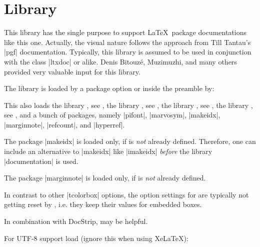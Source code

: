 \clearpage
\section{Library }\label{sec:documentation}%
%
This library has the single purpose to support \LaTeX\ package documentations
like this one. Actually, the visual nature follows the approach from
Till Tantau's |pgf| \cite{tantau:tikz_and_pgf} documentation.
Typically, this library is assumed to be used in conjunction with the
class |ltxdoc| or alike.
Denis Bitouz\'e, Muzimuzhi, and many others provided very valuable input for this library.

The library is loaded by a package option or inside the preamble by:
\begin{dispListing}
\end{dispListing}
This also loads
the library , see ,
the library , see ,
the library , see ,
the library , see ,
and a bunch of packages, namely
|pifont|, |marvosym|, |makeidx|, |marginnote|, |refcount|, and |hyperref|.

\begin{marker}
The package |makeidx| is loaded only, if  is
\emph{not} already defined. Therefore, one can include an alternative to |makeidx| like
|imakeidx| \emph{before} the library |documentation| is used.
\end{marker}
\begin{marker}
The package |marginnote| is loaded only, if  is
\emph{not} already defined.
\end{marker}
\begin{marker}
In contrast to other |tcolorbox| options, the option
settings for  are typically not
getting reset by , i.e. they keep their
values for embedded boxes.
\end{marker}
\begin{marker}
In combination with DocStrip,  may be helpful.
\end{marker}

For UTF-8 support load (ignore this when using Xe\LaTeX):
\begin{dispListing}
\end{dispListing}

